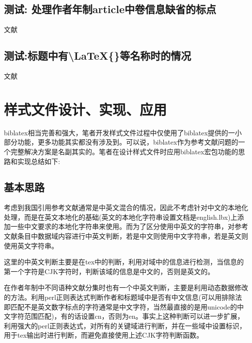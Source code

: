 \subsection{测试: 处理作者年制article中卷信息缺省的标点}\label{sec:article:novol}
\begin{refsection}
文献\cite{刘彻东1998-38-39}\cite{亚洲地质图编目组1978-194-208}
\cite{高光明1998-60-65}

\printbibliography[heading=bibliography,title=【author-year style:article without volume】]
\end{refsection}

\subsection{测试:标题中有\textbackslash LaTeX\{\}等名称时的情况}\label{sec:with:latex}
\begin{refsection}
文献\cite{Peebles2001-100-100}\cite{赵凯华1995--}\cite{蒋有绪1998--}

\printbibliography[heading=bibliography,title=【title with \textbackslash LaTeX\{\}】]
\end{refsection}


\section{样式文件设计、实现、应用}\label{sec:biblatex:mech}
biblatex相当完善和强大，笔者开发样式文件过程中仅使用了biblatex提供的一小部分功能，更多功能其实都没有涉及到。可以说，biblatex作为参考文献问题的一个完整解决方案是名副其实的。笔者在设计样式文件时应用biblatex宏包功能的思路和实现总结如下:

\subsection{基本思路}

考虑到我国引用参考文献通常是中英文混合的情况，因此不考虑针对中文的本地化处理，而是在英文本地化的基础(英文的本地化字符串设置文档是english.lbx)上添加一些中文要求的本地化字符串来使用。而为了区分使用中英文的字符串，对参考文献条目中数据域内容进行中英文判断，若是中文则使用中文字符串，若是英文则使用英文字符串。

这里的中英文判断主要是在tex中的判断，利用对域中的信息进行检测，当信息的第一个字符是CJK字符时，判断该域的信息是中文的，否则是英文的。

在作者年制中不同语种文献分集时也有一个中英文判断，主要是利用动态数据修改的方法。利用perl正则表达式判断作者和标题域中是否有中文信息(可以用排除法即匹配不是英文数字标点的字符通常是中文字符，当然最直接的是用unicode的中文字符范围匹配)，有的话设置cn，否则为en。事实上这种判断可以进一步扩展，利用强大的perl正则表达式，对所有的关键域进行判断，并在一些域中设置标识，用于tex输出时进行判断，而避免直接使用上述CJK字符判断函数。

